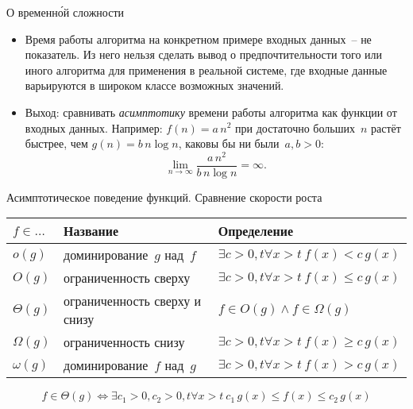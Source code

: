 \documentclass[landscape]{slides}
\begin{document}
\begin{slide}
  О временн\'{о}й сложности
  \begin{itemize}
    \item Время работы алгоритма на конкретном примере входных данных~-- не показатель. Из него нельзя сделать
      вывод о предпочтительности того или иного алгоритма для применения в реальной системе, где входные данные
      варьируются в широком классе возможных значений.
    \item Выход: сравнивать \emph{асимптотику} времени работы алгоритма как функции от входных данных.
      Например: $f(n)=a\,n^2$ при достаточно больших~$n$ растёт быстрее, чем $g(n)=b\,n\log n$, каковы бы ни были~$a,b>0$:
      \[
        \lim_{n \to \infty} \frac{a\,n^2}{b\,n\log n} = \infty .
      \]
  \end{itemize}
\end{slide}

\begin{slide}
  Асимптотическое поведение функций. Сравнение скорости роста
  \begin{center}
    \renewcommand{\arraystretch}{2}
    \begin{tabularx}{\textwidth}{|l|l|X|}
      \hline
      $f\in\ldots$&
      Название&
      Определение
      \\
      \hline
      \hline
      $o(g)$&
      доминирование~$g$ над~$f$&
      $\exists c>0, t \forall x>t\ f(x) < c\,g(x)$
      \\
      \hline
      $O(g)$&
      ограниченность сверху&
      $\exists c>0, t \forall x>t\ f(x) \leqslant c\,g(x)$
      \\
      \hline
      $\Theta(g)$&
      ограниченность сверху и снизу&
      $f\in O(g) \land f\in \Omega(g)$
      \\
      \hline
      $\Omega(g)$&
      ограниченность снизу&
      $\exists c>0, t \forall x>t\ f(x) \geqslant c\,g(x)$
      \\
      \hline
      $\omega(g)$&
      доминирование~$f$ над~$g$&
      $\exists c>0, t \forall x>t\ f(x) > c\,g(x)$
      \\
      \hline
    \end{tabularx}
  \end{center}
  \[
    f\in\Theta(g) \Leftrightarrow \exists c_1>0,c_2>0, t\forall x>t\ c_1\, g(x) \leqslant f(x) \leqslant c_2\,g(x)
  \]
\end{slide}
\end{document}
